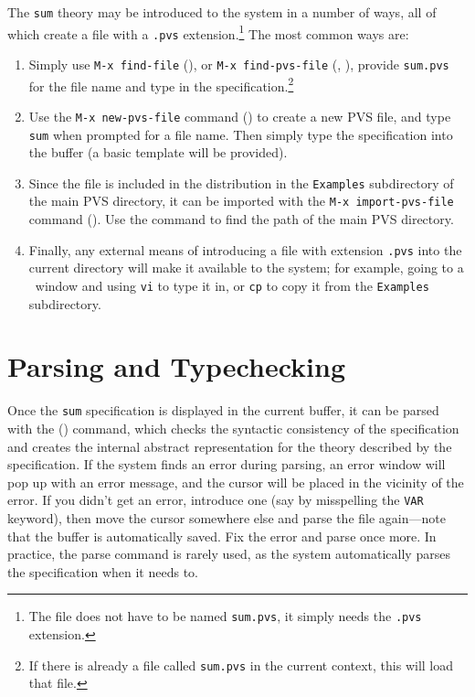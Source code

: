 The \texttt{sum} theory may be introduced to the system in a number of
ways, all of which create a file with a \texttt{.pvs}
extension.\footnote{The file does not have to be named \texttt{sum.pvs}, it
simply needs the \texttt{.pvs} extension.}  The most common ways are:
\begin{enumerate}

\item Simply use \texttt{M-x find-file} (), or \texttt{M-x
find-pvs-file} (, ), provide \texttt{sum.pvs} for
the file name and type in the specification.\footnote{If there is already
a file called \texttt{sum.pvs} in the current context, this will load that
file.}

\item Use the \texttt{M-x new-pvs-file} command () to create a
new PVS file, and type \texttt{sum} when prompted for a file name.  Then
simply type the specification into the buffer (a basic template will be provided). 

\item Since the file is included in the distribution in the
\texttt{Examples} subdirectory of the main PVS directory, it can be
imported with the \texttt{M-x import-pvs-file} command ().  Use
the  command to find the path of the main PVS directory.

\item Finally, any external means of introducing a file with extension
\texttt{.pvs} into the current directory will make it available to the
system; for example, going to a \unix\ window and using \texttt{vi} to
type it in, or \texttt{cp} to copy it from the \texttt{Examples}
subdirectory.

\end{enumerate}

\section{Parsing and Typechecking}

Once the \texttt{sum} specification is displayed in the current buffer, it
can be parsed with the  () command, which checks the
syntactic consistency of the specification and creates the internal
abstract representation for the theory described by the specification.  If
the system finds an error during parsing, an error window will pop up with
an error message, and the cursor will be placed in the vicinity of the
error.  If you didn't get an error, introduce one (say by misspelling the
\texttt{VAR} keyword), then move the cursor somewhere else and parse the
file again---note that the buffer is automatically saved.  Fix the error
and parse once more.  In practice, the parse command is rarely used, as
the system automatically parses the specification when it needs to.

